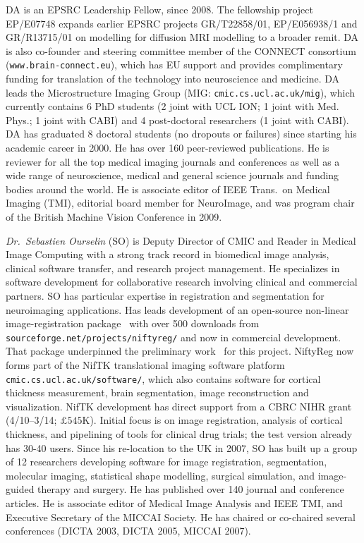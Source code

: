 \documentclass[a4paper,11pt]{article}
\begin{document}
DA is an EPSRC Leadership Fellow, since 2008.  The fellowship project
EP/E07748 expands earlier EPSRC projects GR/T22858/01, EP/E056938/1
and GR/R13715/01 on modelling for diffusion MRI modelling to a broader
remit.  DA is also co-founder and steering committee member of the
CONNECT consortium (\verb+www.brain-connect.eu+), which has EU support
and provides complimentary funding for translation of the technology
into neuroscience and medicine.  DA leads the Microstructure Imaging
Group (MIG: \verb+cmic.cs.ucl.ac.uk/mig+), which currently contains 6
PhD students (2 joint with UCL ION; 1 joint with Med. Phys.; 1 joint
with CABI) and 4 post-doctoral researchers (1 joint with CABI).  DA
has graduated 8 doctoral students (no dropouts or failures) since
starting his academic career in 2000.  He has over 160 peer-reviewed
publications. He is reviewer for all the top medical imaging journals
and conferences as well as a wide range of neuroscience, medical and
general science journals and funding bodies around the world. He is
associate editor of IEEE Trans.\ on Medical Imaging (TMI), editorial
board member for NeuroImage, and was program chair of the British
Machine Vision Conference in 2009.

\emph{Dr.\ Sebastien Ourselin} (SO) is Deputy Director of CMIC and
Reader in Medical Image Computing with a strong track record in
biomedical image analysis, clinical software transfer, and research
project management.  He specializes in software development for
collaborative research involving clinical and commercial partners.  SO
has particular expertise in registration and segmentation for
neuroimaging applications.  Has leads development of an open-source
non-linear image-registration package~\cite{ModatCMPB10} with over 500
downloads from \verb+sourceforge.net/projects/niftyreg/+ and now in
commercial development.  That package underpinned the preliminary
work~\cite{FonteijnScience11} for this project.  NiftyReg now forms
part of the NifTK translational imaging software platform
\verb+cmic.cs.ucl.ac.uk/software/+, which also contains software for
cortical thickness measurement, brain segmentation, image
reconstruction and visualization.  NifTK development has direct
support from a CBRC NIHR grant (4/10--3/14; $\pounds545$K).  Initial
focus is on image registration, analysis of cortical thickness, and
pipelining of tools for clinical drug trials; the test version already
has 30-40 users.  Since his re-location to the UK in 2007, SO has
built up a group of 12 researchers developing software for image
registration, segmentation, molecular imaging, statistical shape
modelling, surgical simulation, and image-guided therapy and surgery.
He has published over 140 journal and conference articles. He is
associate editor of Medical Image Analysis and IEEE TMI, and Executive
Secretary of the MICCAI Society. He has chaired or co-chaired several
conferences (DICTA 2003, DICTA 2005, MICCAI 2007).
\end{document}
